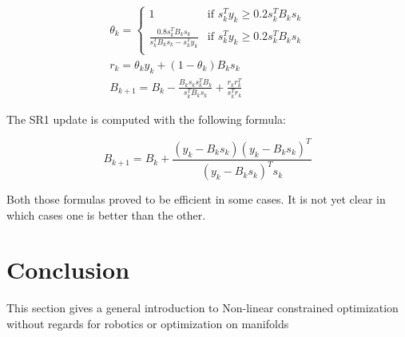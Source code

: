 \begin{equation}
\label{damped_BFGS}
\begin{split}
  \theta_k =
  \left\{
      \begin{array}{ll}
      1 & \text{if } s_k^T y_k \geq 0.2 s_k^T B_k s_k \\
      \frac{0.8 s_k^T B_k s_k}{s_k^T B_k s_k-s_k^T y_k} & \text{if } s_k^T y_k \geq 0.2s_k^T B_k s_k \\
      \end{array}
      \right.\\
      r_k = \theta_k y_k + (1-\theta_k) B_k s_k\\
      B_{k+1} = B_k-\frac{B_k s_k s_k^T B_k}{s_k^T B_k s_k} + \frac{r_k r_k^T}{s_k^T r_k}
\end{split}
\end{equation}

The SR1 update is computed with the following formula:

\begin{equation}
\label{SR1}
B_{k+1} = B_k + \frac{(y_k-B_k s_k){(y_k-B_k s_k)}^T}{{(y_k-B_k s_k)}^T s_k}
\end{equation}

Both those formulas proved to be efficient in some cases. It is not yet clear in which cases one is better than the other.

\section{Conclusion}
This section gives a general introduction to Non-linear constrained optimization without regards for robotics or optimization on manifolds

